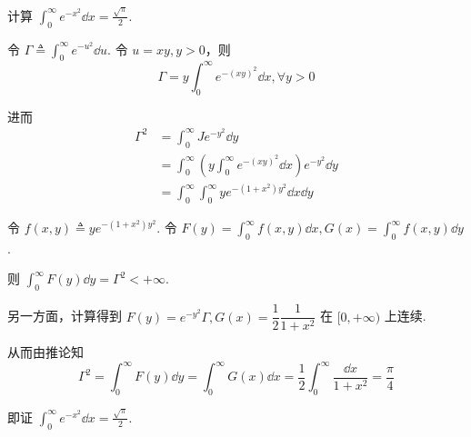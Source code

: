 \begin{example}
    计算 $\displaystyle\int_0^\infty e^{-x^2}\dd x=\frac{\sqrt{\pi}}{2}$.

    令 $\Gamma\triangleq\displaystyle\int_0^\infty e^{-u^2}\dd u$. 令 $u=xy,y>0$，则
$$
\Gamma=y\int_0^\infty e^{-(xy)^2}\dd x,\forall y>0
$$

    进而
$$
\begin{aligned}
    \Gamma^2&=\int_0^\infty Je^{-y^2}\dd y\\
    &=\int_0^\infty\left(y\int_0^\infty e^{-(xy)^2}\dd x\right)e^{-y^2}\dd y\\
    &=\int_0^\infty\int_0^\infty ye^{-(1+x^2)y^2}\dd x\dd y
\end{aligned}
$$

    令 $f(x,y)\triangleq ye^{-(1+x^2)y^2}$. 令 $F(y)=\displaystyle\int_0^\infty f(x,y)\dd x,G(x)=\int_0^\infty f(x,y)\dd y$.

    则 $\displaystyle\int_0^\infty F(y)\dd y=\Gamma^2<+\infty$.

    另一方面，计算得到 $F(y)=e^{-y^2}\Gamma,G(x)=\dfrac{1}{2}\dfrac{1}{1+x^2}$ 在 $[0,+\infty)$ 上连续.

    从而由推论知
$$
\Gamma^2=\int_0^\infty F(y)\dd y=\int_0^\infty G(x)\dd x=\frac{1}{2}\int_0^\infty\frac{\dd x}{1+x^2}=\frac{\pi}{4}
$$

    即证 $\displaystyle\int_0^\infty e^{-x^2}\dd x=\frac{\sqrt{\pi}}{2}$.
\end{example}